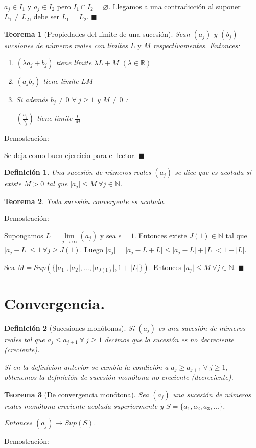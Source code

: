 \documentclass[12pt]{book}
\newcommand\R{{\mathbb R}}
\newcommand\N{{\mathbb N}}
\providecommand{\abs}[1]{\lvert#1\rvert}
\newtheorem{teo}{Teorema}[section]
\newtheorem{defi}{Definición}[section]
\begin{document}
$a_j \in I_1$ y $a_j \in I_2$ pero $I_1 \cap I_2 = \varnothing$. Llegamos a una contradicción al suponer $L_1 \neq L_2$, debe ser $L_1 = L_2$.
$\blacksquare$
\begin{teo}[Propiedades del límite de una sucesión]\rm\label{PropiedadesLimiteSucesion}
Sean $(a_j)$ y $(b_j)$ sucsiones de números reales con límites $L \mbox{ y } M$ respectivamentes. Entonces:

\begin{enumerate}[1)]
    \item $(\lambda a_j+b_j)$ tiene límite $\lambda L+M$ $(\lambda \in \R)$
    \item $(a_jb_j)$ tiene límite $LM$
    \item Si además $b_j \neq 0$ $\forall \ j \ge 1$ y $M \neq 0$ :
    
    $(\frac{a_j}{b_j})$ tiene límite $\frac{L}{M}$
\end{enumerate}
\end{teo}
Demostración:

Se deja como buen ejercicio para el lector. $\blacksquare$
\begin{defi}\rm
Una sucesión de números reales $(a_j)$ se dice que es acotada si existe $M>0$ tal que $\abs{a_j} \le M \ \forall{j \in \N}$.
\end{defi}
\begin{teo}\rm
Toda sucesión convergente es acotada.
\end{teo}
Demostración:

Supongamos $L= \lim\limits_{j\to\infty}(a_{j})$ y sea $\epsilon=1$. Entonces existe $J(1) \in \N$ tal que $\abs{a_j-L} \le 1 \ \forall{j \ge J(1)}$. Luego $\abs{a_j} = \abs{a_j-L+L} \le \abs{a_j-L}+\abs{L} < 1+\abs{L}$.

Sea $M=Sup(\{ \abs{a_1},\abs{a_2},\dots,\abs{a_{J(1)}},1+\abs{L} \})$. Entonces $\abs{a_j} \le M \ \forall{j \in \N}$. $\blacksquare$

\section{Convergencia.}
\begin{defi}[Sucesiones monótonas]\rm
Si $(a_j)$ es una sucesión de números reales tal que $a_j \le a_{j+1} \ \forall \ j \ge 1$ decimos que la sucesión es no decreciente (creciente).

Si en la definicion anterior se cambia la condición a $a_j \ge a_{j+1} \ \forall \ j \ge 1$, obtenemos la definición de sucesión monótona no creciente (decreciente).
\end{defi}
\begin{teo}[De convergencia monótona]\rm\label{ConvergenciaMonotona}
Sea $(a_j)$ una sucesión de números reales monótona creciente acotada superiormente y $S=\{a_1,a_2,a_3, \dots \}$.

Entonces $(a_j) \rightarrow Sup(S)$.
\end{teo}
Demostración:
\end{document}
